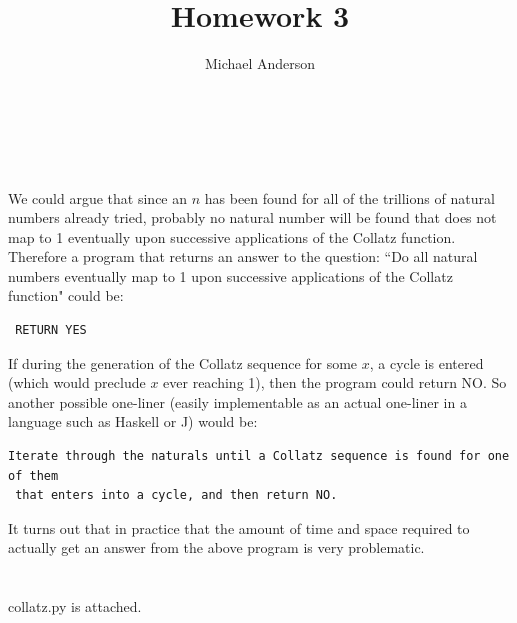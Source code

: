 \documentclass{article}
\author{Michael Anderson}
\title{Homework 3}
\begin{document}
\maketitle
{}
\\
\flushleft
\newpage

\section{}
We could argue that since an $n$ has been found for all of the trillions of
natural numbers already tried, probably no natural number will be found that
does not map to 1 eventually upon successive applications of the Collatz
function. Therefore a program that returns an answer to the question: ``Do all
natural numbers eventually map to 1 upon successive applications of the
Collatz function" could be:

\begin{verbatim} RETURN YES \end{verbatim}

If during the generation of the Collatz sequence for some $x$, a cycle is
entered (which would preclude $x$ ever reaching 1),
then the program could return NO. So
another possible one-liner (easily implementable as an actual one-liner in a
language such as Haskell or J) would be:

\begin{verbatim}
Iterate through the naturals until a Collatz sequence is found for one of them
 that enters into a cycle, and then return NO.
\end{verbatim}

It turns out that in practice that the amount of time and space required to
actually get an answer from the above program is very problematic.

\section{}
collatz.py is attached.
\end{document}
